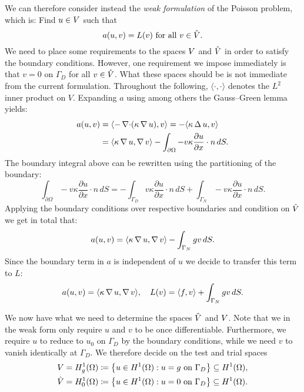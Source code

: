 We can therefore consider instead the \emph{weak formulation} of the Poisson
problem, which is: Find \( u \in V \) such that 
\begin{equation}
    a(u, v) = L(v) \text{ for all } v \in \hat{V}.
\end{equation}
We need to place some requirements to the spaces \(V \) and \(\hat{V}\) in
order to satisfy the boundary conditions. However, one requirement we impose
immediately is that \(v = 0\) on \( \Gamma_D \) for all \( v \in \hat{V}\).  What
these spaces should be is not immediate from the current formulation. Throughout
the following, \( \langle \cdot, \cdot \rangle \) denotes the \( L^2 \) inner
product on \( V \). Expanding \( a \) using among others the Gauss--Green
lemma yields:
\begin{align}
    a(u, v) &= \langle -\operatorname{\mathop{}\!\nabla \cdot}(\kappa \operatorname{\mathop{}\!\nabla} u), v \rangle = -\langle \kappa \operatorname{\mathop{}\!\Delta} u, v \rangle\\
            &= \langle \kappa \operatorname{\mathop{}\!\nabla} u, \operatorname{\mathop{}\!\nabla} v \rangle - \int_{\partial\Omega} - v \kappa  \frac{\partial u}{\partial x}  \cdot n \, dS.
\end{align}
The boundary integral above can be rewritten using the partitioning of the boundary:
\begin{equation}
    \int_{\partial\Omega} -v \kappa  \frac{\partial u}{\partial x}  \cdot n \, dS =
    -\int_{\Gamma_D} v \kappa \frac{\partial u}{\partial x} \cdot n \, dS + \int_{\Gamma_N} -v \kappa \frac{\partial u}{\partial x} \cdot n \, dS.
\end{equation}
Applying the boundary conditions over respective boundaries and condition on \(
\hat{V} \) we get in total that:
\begin{equation}
    a(u, v) = \langle \kappa\operatorname{\mathop{}\!\nabla} u, \operatorname{\mathop{}\!\nabla} v \rangle - \int_{\Gamma_N} g v \, dS.
\end{equation}
Since the boundary term in \( a \) is independent of \( u \) we decide to
transfer this term to \( L \):
\begin{equation}
    a(u, v) = \langle \kappa\operatorname{\mathop{}\!\nabla} u, \operatorname{\mathop{}\!\nabla} v \rangle, \quad L(v) = \langle f, v
    \rangle + \int_{\Gamma_N} g v \, dS.
\end{equation}


We now have what we need to determine the spaces \( \hat{V} \) and \( V \).
Note that we in the weak form only require \( u \) and \( v \) to be once
differentiable. Furthermore, we require \( u \) to reduce to \( u_0 \) on \(
\Gamma_D \) by the boundary conditions, while we need \( v \) to vanish
identically at \(\Gamma_D\). We therefore decide on the test and trial spaces
\begin{align}
    V &= H^1_g(\Omega) \coloneqq \left\{ u \in H^1(\Omega) : u = g \text{ on } \Gamma_D \right\} \subseteq H^1(\Omega),\\
    \hat{V} &= H^1_0(\Omega) \coloneqq \left\{ u \in H^1(\Omega) : u = 0 \text{ on } \Gamma_D \right\} \subseteq H^1 (\Omega).
\end{align}

